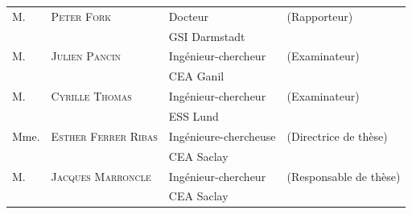 \begin{titlepage}
\begin{textblock}{14}
\begin{center}
\begin{tabular}{llll}
				M.    & \textsc{Peter Fork}          & Docteur                 & (Rapporteur)           \\
				\null & \null                        & GSI Darmstadt           &                        \\ 
				M.    & \textsc{Julien Pancin}       & Ingénieur-chercheur     & (Examinateur)          \\
        		\null & \null                        & CEA Ganil              &                        \\
        		M.    & \textsc{Cyrille Thomas}      & Ingénieur-chercheur     & (Examinateur)          \\
				\null & \null                        & ESS Lund                &                        \\ 				
				Mme.  & \textsc{Esther Ferrer Ribas} & Ingénieure-chercheuse   & (Directrice de thèse)  \\
				\null & \null                        & CEA Saclay              &                        \\ 
				
				M.    & \textsc{Jacques Marroncle}   & Ingénieur-chercheur     & (Responsable de thèse) \\
				\null & \null                        & CEA Saclay              &                        \\ 		
			\end{tabular}
		\end{center}
	\end{textblock}
\end{titlepage}